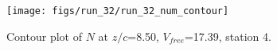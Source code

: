 \begin{figure}[H]
\centering
\texttt{[image: figs/run\_32/run\_32\_num\_contour]}
\caption{Contour plot of $N$ at $z/c$=8.50, $V_{free}$=17.39, station 4.}
\label{fig:run_32_num_contour}
\end{figure}


